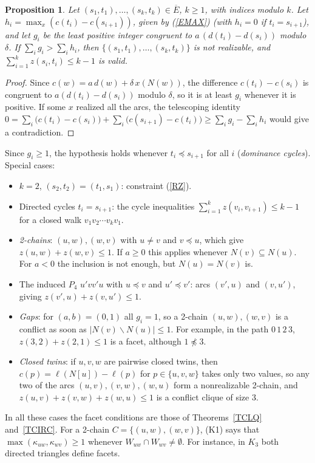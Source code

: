 \documentclass[a4paper,11pt]{article}
\newcommand{\Eb}{\overline{E}}
\newtheorem{prop}{Proposition}
\theoremstyle{definition}
\begin{document}
\begin{prop} \label{PGAP}
Let $(s_1,t_1), \ldots, (s_k,t_k) \in \Eb$, $k \geq 1$, with indices modulo $k$. Let
$h_i = \max_x (c(t_i) - c(s_{i+1}))$, given by (\ref{EMAX}) (with $h_i = 0$ if $t_i = s_{i+1}$), and let $g_i$ be the least positive integer
congruent to $a\,(d(t_i) - d(s_i))$ modulo $\delta$. If $\sum_i g_i > \sum_i h_i$, then $\{(s_1,t_1), \ldots, (s_k,t_k)\}$ is not realizable, and
$\sum_{i=1}^k z(s_i,t_i) \leq k - 1$ is valid.
\end{prop}
\begin{proof}
Since $c(w) = a\,d(w) + \delta\,x(N(w))$, the difference $c(t_i) - c(s_i)$ is congruent to $a(d(t_i) - d(s_i))$ modulo $\delta$, so it is at least $g_i$
whenever it is positive. If some $x$ realized all the arcs, the telescoping identity
$0 = \sum_i \bigl(c(t_i) - c(s_i)\bigr) + \sum_i \bigl(c(s_{i+1}) - c(t_i)\bigr) \geq \sum_i g_i - \sum_i h_i$ would give a contradiction.
\end{proof}

Since $g_i \geq 1$, the hypothesis holds whenever $t_i \preceq s_{i+1}$ for all $i$ (\emph{dominance cycles}). Special cases:
\begin{itemize}
\item $k = 2$, $(s_2,t_2) = (t_1,s_1)$: constraint (\ref{RZ}).
\item Directed cycles $t_i = s_{i+1}$: the cycle inequalities $\sum_{i=1}^k z(v_i, v_{i+1}) \leq k - 1$ for a closed walk
$v_1 v_2 \cdots v_k v_1$.
\item \emph{2-chains}: $(u,w), (w,v)$ with $u \neq v$ and $v \preceq u$, which give $z(u,w) + z(w,v) \leq 1$. If $a \geq 0$ this applies whenever $N(v) \subseteq N(u)$. For $a < 0$ the
inclusion is not enough, but $N(u) = N(v)$ is.
\item The induced $P_4$ $u'vv'u$ with $u \preceq v$ and $u' \preceq v'$: arcs $(v',u)$ and $(v,u')$, giving $z(v',u) + z(v,u') \leq 1$.
\item \emph{Gaps}: for $(a,b) = (0,1)$ all $g_i = 1$, so a 2-chain $(u,w),(w,v)$ is a conflict as soon as $|N(v) \backslash N(u)| \leq 1$. For example,
in the path $0\,1\,2\,3$, $z(3,2) + z(2,1) \leq 1$ is a facet, although $1 \not\preceq 3$.
\item \emph{Closed twins}: if $u, v, w$ are pairwise closed twins, then $c(p) = \ell(N[u]) - \ell(p)$ for $p \in \{u,v,w\}$ takes only two values,
so any two of the arcs $(u,v), (v,w), (w,u)$ form a nonrealizable 2-chain, and $z(u,v) + z(v,w) + z(w,u) \leq 1$ is a conflict clique of size 3.
\end{itemize}
In all these cases the facet conditions are those of Theorems~\ref{TCLQ} and~\ref{TCIRC}. For a 2-chain $C = \{(u,w),(w,v)\}$, (K1) says
that $\max(\kappa_{uw}, \kappa_{wv}) \geq 1$ whenever $W_{uw} \cap W_{wv} \neq \emptyset$. For instance, in $K_3$ both directed triangles define facets.
\end{document}
